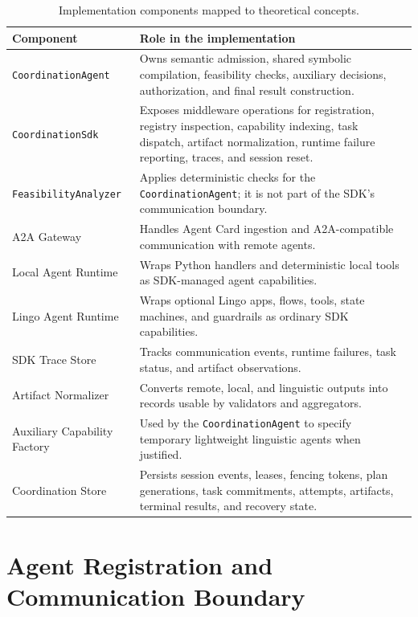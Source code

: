 \begin{table}[htbp]
\centering
\caption{Implementation components mapped to theoretical concepts.}
\label{tab:implementation-components}
\begin{tabular}{p{}p{}}
\toprule
\textbf{Component} & \textbf{Role in the implementation} \\
\midrule
\texttt{CoordinationAgent} & Owns semantic admission, shared symbolic compilation, feasibility checks, auxiliary decisions, authorization, and final result construction. \\
\texttt{CoordinationSdk} & Exposes middleware operations for registration, registry inspection, capability indexing, task dispatch, artifact normalization, runtime failure reporting, traces, and session reset. \\
\texttt{FeasibilityAnalyzer} & Applies deterministic checks for the \texttt{CoordinationAgent}; it is not part of the SDK's communication boundary. \\
A2A Gateway & Handles Agent Card ingestion and A2A-compatible communication with remote agents. \\
Local Agent Runtime & Wraps Python handlers and deterministic local tools as SDK-managed agent capabilities. \\
Lingo Agent Runtime & Wraps optional Lingo apps, flows, tools, state machines, and guardrails as ordinary SDK capabilities. \\
SDK Trace Store & Tracks communication events, runtime failures, task status, and artifact observations. \\
Artifact Normalizer & Converts remote, local, and linguistic outputs into records usable by validators and aggregators. \\
Auxiliary Capability Factory & Used by the \texttt{CoordinationAgent} to specify temporary lightweight linguistic agents when justified. \\
Coordination Store & Persists session events, leases, fencing tokens, plan generations, task commitments, attempts, artifacts, terminal results, and recovery state. \\
\bottomrule
\end{tabular}
\end{table}

\section{Agent Registration and Communication Boundary}


